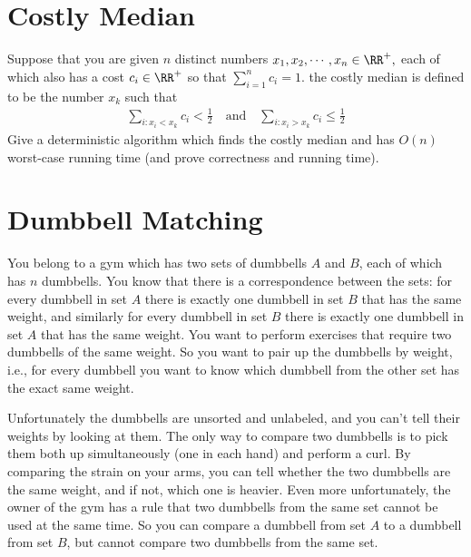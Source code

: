 \documentclass{article}
\begin{document}
\section{Costly Median}
 
Suppose that you are given $n$ distinct numbers $x_1, x_2, \cdots, x_n\in\RR^+,$ each of which also has a cost $c_i\in\RR^+$ so that $\sum_{i=1}^{n} c_i=1.$ the costly median is defined to be the number $x_k$ such that
\begin{align*}
	\sum_{i: x_i<x_k}^{} c_i<\frac{1}{2} \quad\text{and}\quad \sum_{i:x_i>x_k}^{}c_i\le\frac{1}{2}
\end{align*}
Give a deterministic algorithm which finds the costly median and has $O(n)$ worst-case running time (and prove correctness and running time).

\section{Dumbbell Matching}
You belong to a gym which has two sets of dumbbells $A$ and $B$, each of which has $n$ dumbbells.  You know that there is a correspondence between the sets: for every dumbbell in set $A$ there is exactly one dumbbell in set $B$ that has the same weight, and similarly for every dumbbell in set $B$ there is exactly one dumbbell in set $A$ that has the same weight.  You want to perform exercises that require two dumbbells of the same weight.  So you want to pair up the dumbbells by weight, i.e., for every dumbbell you want to know which dumbbell from the other set has the exact same weight.

Unfortunately the dumbbells are unsorted and unlabeled, and you can't tell their weights by looking at them. The only way to compare two dumbbells is to pick them both up simultaneously (one in each hand) and perform a curl.  By comparing the strain on your arms, you can tell whether the two dumbbells are the same weight, and if not, which one is heavier.  Even more unfortunately, the owner of the gym has a rule that two dumbbells from the same set cannot be used at the same time.  So you can compare a dumbbell from set $A$ to a dumbbell from set $B$, but cannot compare two dumbbells from the same set.  
\end{document}
